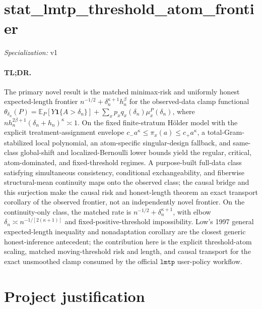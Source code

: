 \documentclass{article}
\begin{document}
\sloppy

\section*{stat\_\allowbreak{}lmtp\_\allowbreak{}threshold\_\allowbreak{}atom\_\allowbreak{}frontier}

\noindent\textit{Specialization:} v1\par

\paragraph{TL;DR.} The primary novel result is the matched minimax-risk and uniformly honest expected-length frontier \(n^{-1/2}+\delta_n^{\kappa+1}h_n^\beta\) for the observed-data clamp functional \(\theta_{\delta_n}(P)=\mathbb E_P[Y\mathbf 1\{A>\delta_n\}]+\sum_xp_xq_x(\delta_n)\mu_x^P(\delta_n)\), where \(n h_n^{2\beta+1}(\delta_n+h_n)^\kappa\asymp1\). On the fixed finite-stratum Hölder model with the explicit treatment-assignment envelope \(c_-a^\kappa\leq\pi_x(a)\leq c_+a^\kappa\), a total-Gram-stabilized local polynomial, an atom-specific singular-design fallback, and same-class global-shift and localized-Bernoulli lower bounds yield the regular, critical, atom-dominated, and fixed-threshold regimes. A purpose-built full-data class satisfying simultaneous consistency, conditional exchangeability, and fiberwise structural-mean continuity maps onto the observed class; the causal bridge and this surjection make the causal risk and honest-length theorem an exact transport corollary of the observed frontier, not an independently novel frontier. On the continuity-only class, the matched rate is \(n^{-1/2}+\delta_n^{\kappa+1}\), with elbow \(\delta_n\asymp n^{-1/[2(\kappa+1)]}\) and fixed-positive-threshold impossibility. Low's 1997 general expected-length inequality and nonadaptation corollary are the closest generic honest-inference antecedent; the contribution here is the explicit threshold-atom scaling, matched moving-threshold risk and length, and causal transport for the exact unsmoothed clamp consumed by the official \(\texttt{lmtp}\) user-policy workflow.

\section{Project justification}
\end{document}
